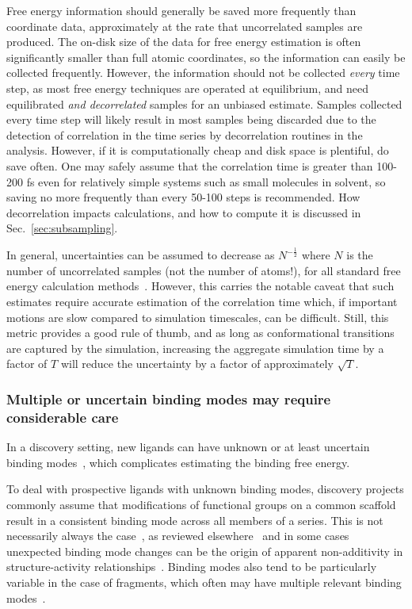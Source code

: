 \documentclass[9pt,bestpractices]{livecoms}
\begin{document}
Free energy information should generally be saved more frequently than coordinate data, approximately at the rate that uncorrelated samples are produced.  
The on-disk size of the data for free energy estimation is often significantly smaller than full atomic coordinates, so the information can easily be collected frequently. 
However, the information should not be collected \textit{every} time step, as most free energy techniques are operated at equilibrium, and need equilibrated \textit{and decorrelated} samples for an unbiased estimate.
Samples collected every time step will likely result in most samples being discarded due to the detection of correlation in the time series by decorrelation routines in the analysis. However, if it is computationally cheap and disk space is plentiful, do save often. One may safely assume that the correlation time is greater than 100-200 fs even for relatively simple systems such as small molecules in solvent, so saving no more frequently than every 50-100 steps is recommended. 
How decorrelation impacts calculations, and how to compute it is discussed in Sec.~\ref{sec:subsampling}.

In general, uncertainties can be assumed to decrease as $N^{-\frac{1}{2}}$ where $N$ is the number of uncorrelated samples (not the number of atoms!), for all standard free energy calculation methods~\cite{shirts2005comparison}. However, this carries the notable caveat that such estimates require accurate estimation of the correlation time which, if important motions are slow compared to simulation timescales, can be difficult. Still, this metric provides a good rule of thumb, and as long as conformational transitions are captured by the simulation, increasing the aggregate simulation time by a factor of $T$ will reduce the uncertainty by a factor of approximately $\sqrt{T}$.

\subsubsection{Multiple or uncertain binding modes may require considerable care}
\label{sec:multiple_binding_modes}
In a discovery setting, new ligands can have unknown or at least uncertain binding modes~\cite{kaus2015how, plountprice2000analysis,mobley2009binding,calabro2016elucidation}, which complicates estimating the binding free energy.

To deal with prospective ligands with unknown binding modes, discovery projects commonly assume that modifications of functional groups on a common scaffold result in a consistent binding mode across all members of a series.
This is not necessarily always the case~\cite{kaus2015how}, as reviewed elsewhere~\cite{mobley2009binding} and in some cases unexpected binding mode changes can be the origin of apparent non-additivity in structure-activity relationships~\cite{calabro2016elucidation}.
Binding modes also tend to be particularly variable in the case of fragments, which often may have multiple relevant binding modes~\cite{steinbrecher2015accurate}.
\end{document}
